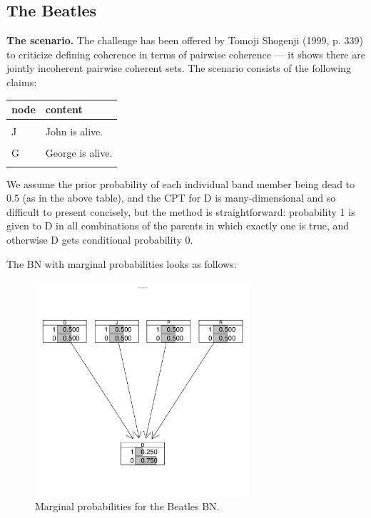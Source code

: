 \documentclass[10pt,]{scrartcl}
\begin{document}
\subsection{The Beatles}

\textbf{The scenario.} The challenge has been offered by Tomoji Shogenji
(1999, p. 339) to criticize defining coherence in terms of pairwise
coherence --- it shows there are jointly incoherent pairwise coherent
sets. The scenario consists of the following claims:

\begin{table}[H]
\centering
\begin{tabular}{ll}
\toprule
node & content\\
\midrule
\cellcolor{gray!6}{D} & \cellcolor{gray!6}{Exactly one of the Beatles (John, Paul, George and Ringo) is dead.}\\
J & John is alive.\\
\cellcolor{gray!6}{P} & \cellcolor{gray!6}{Paul is alive.}\\
G & George is alive.\\
\cellcolor{gray!6}{R} & \cellcolor{gray!6}{Ringo is alive.}\\
\bottomrule
\end{tabular}
\end{table}

We assume the prior probability of each individual band member being
dead to 0.5 (as in the above table), and the CPT for \textsf{D} is
many-dimensional and so difficult to present concisely, but the method
is straightforward: probability 1 is given to \textsf{D} in all
combinations of the parents in which exactly one is true, and otherwise
\textsf{D} gets conditional probability 0.


The BN with marginal probabilities looks as follows:

\begin{figure}[h]
\hspace{25mm}
\includegraphics[width =8cm]{BeatlesBN.png}
\caption{Marginal probabilities for the Beatles BN.}
\label{fig:BeatlesBN3}
\end{figure}
\end{document}
